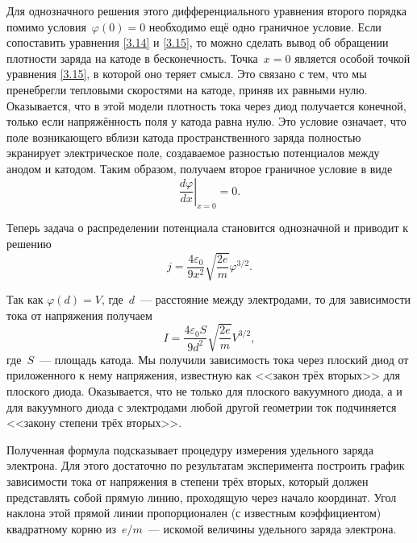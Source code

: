 Для однозначного решения этого дифференциального уравнения второго порядка
помимо условия~$\varphi(0)=0$ необходимо ещё одно граничное условие. Если
сопоставить уравнения \eqref{3.14} и \eqref{3.15}, то можно сделать вывод об
обращении плотности заряда на катоде в бесконечность. Точка~$x=0$ является
особой точкой уравнения \eqref{3.15}, в которой оно теряет смысл. Это связано с
тем, что мы пренебрегли тепловыми скоростями на катоде, приняв их равными нулю.
Оказывается, что в этой модели плотность тока через диод получается конечной,
только если напряжённость поля у катода равна нулю. Это условие означает, что
поле возникающего вблизи катода пространственного заряда полностью экранирует
электрическое поле, создаваемое разностью потенциалов между анодом и катодом.
Таким образом, получаем второе граничное условие в виде
\begin{equation*}
	\left.\frac{d\varphi}{dx}\right|_{x = 0}=0.
\end{equation*}

Теперь задача о распределении потенциала становится однозначной и приводит к
решению
\begin{equation*}
	j=\frac{4\varepsilon_0}{9x^2}\sqrt{\frac{2e}{m}}\varphi^{3/2}.
\end{equation*}

Так как $\varphi(d)=V$, где~$d$~--- расстояние между электродами, то для
зависимости тока от напряжения получаем
\begin{equation*}
	I=\frac{4\varepsilon_0 S}{9d^2}\sqrt{\frac{2e}{m}}V^{3/2},
\end{equation*}
где~$S$~--- площадь катода. Мы получили зависимость тока через плоский диод от
приложенного к нему напряжения, известную как <<закон трёх вторых>> для плоского
диода. Оказывается, что не только для плоского вакуумного диода, а и для
вакуумного диода с электродами любой другой геометрии ток подчиняется <<закону
степени трёх вторых>>.

Полученная формула подсказывает процедуру измерения удельного заряда электрона.
Для этого достаточно по
результатам эксперимента построить график зависимости тока от напряжения в
степени трёх вторых, который должен
представлять собой прямую линию, проходящую через начало координат. Угол наклона
этой прямой линии пропорционален (с известным коэффициентом) квадратному корню
из~$e/m$~--- искомой величины удельного заряда электрона.

